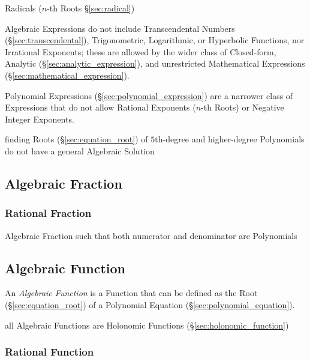 Radicals ($n$-th Roots \S\ref{sec:radical})

Algebraic Expressions do not include Transcendental Numbers
(\S\ref{sec:transcendental}), Trigonometric, Logarithmic, or Hyperbolic
Functions, nor Irrational Exponents; these are allowed by the wider class of
Closed-form, Analytic (\S\ref{sec:analytic_expression}), and unrestricted
Mathematical Expressions (\S\ref{sec:mathematical_expression}).

\fist Polynomial Expressions (\S\ref{sec:polynomial_expression}) are a narrower
class of Expressions that do not allow Rational Exponents ($n$-th Roots) or
Negative Integer Exponents.

finding Roots (\S\ref{sec:equation_root}) of $5$th-degree and higher-degree
Polynomials do not have a general Algebraic Solution



\subsection{Algebraic Fraction}\label{sec:algebraic_fraction}

\subsubsection{Rational Fraction}\label{sec:rational_fraction}

Algebraic Fraction such that both numerator and denominator are Polynomials



\subsection{Algebraic Function}\label{sec:algebraic_function}

An \emph{Algebraic Function} is a Function that can be defined as the Root
(\S\ref{sec:equation_root}) of a Polynomial Equation
(\S\ref{sec:polynomial_equation}).

all Algebraic Functions are Holonomic Functions
(\S\ref{sec:holonomic_function})



\subsubsection{Rational Function}\label{sec:rational_function}

